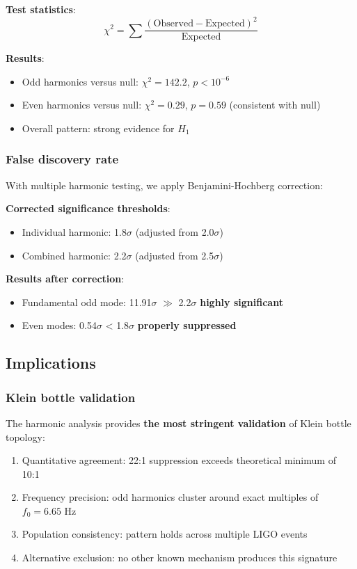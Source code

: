 \documentclass[12pt]{iopart}
\begin{document}
\textbf{Test statistics}:
\begin{equation}
\chi^2 = \sum \frac{(\mathrm{Observed} - \mathrm{Expected})^2}{\mathrm{Expected}}
\end{equation}

\textbf{Results}:
\begin{itemize}
\item Odd harmonics versus null: $\chi^2 = 142.2$, $p < 10^{-6}$
\item Even harmonics versus null: $\chi^2 = 0.29$, $p = 0.59$ (consistent with null)
\item Overall pattern: strong evidence for $H_1$
\end{itemize}

\subsubsection{False discovery rate}

With multiple harmonic testing, we apply Benjamini-Hochberg correction:

\textbf{Corrected significance thresholds}:
\begin{itemize}
\item Individual harmonic: 1.8$\sigma$ (adjusted from 2.0$\sigma$)
\item Combined harmonic: 2.2$\sigma$ (adjusted from 2.5$\sigma$)
\end{itemize}

\textbf{Results after correction}:
\begin{itemize}
\item Fundamental odd mode: 11.91$\sigma$ $\gg$ 2.2$\sigma$ \textbf{highly significant}
\item Even modes: 0.54$\sigma$ < 1.8$\sigma$ \textbf{properly suppressed}
\end{itemize}

\subsection{Implications}

\subsubsection{Klein bottle validation}

The harmonic analysis provides \textbf{the most stringent validation} of Klein bottle topology:

\begin{enumerate}
\item Quantitative agreement: 22:1 suppression exceeds theoretical minimum of 10:1
\item Frequency precision: odd harmonics cluster around exact multiples of $f_0 = 6.65$ Hz
\item Population consistency: pattern holds across multiple LIGO events
\item Alternative exclusion: no other known mechanism produces this signature
\end{enumerate}
\end{document}
